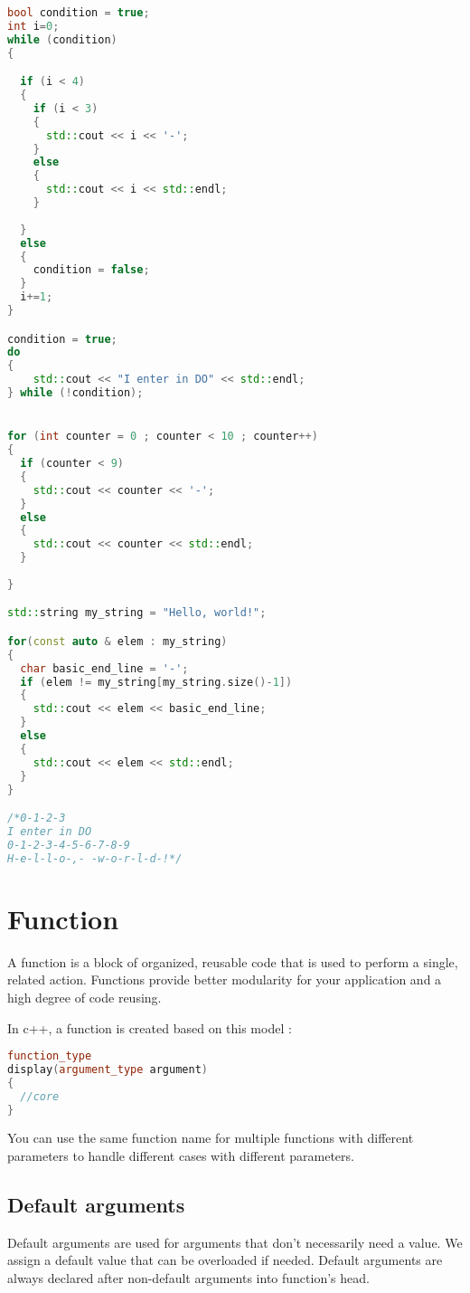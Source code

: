 \documentclass[a4paper, 12pt, titlepage]{scrartcl} %
\begin{document}
\begin{lstlisting}[language=C++]
bool condition = true;
int i=0;
while (condition)
{

  if (i < 4)
  {
    if (i < 3)
    {
      std::cout << i << '-';
    }
    else
    {
      std::cout << i << std::endl;
    }
    
  }
  else
  {
    condition = false;
  }
  i+=1; 
}

condition = true;
do
{
    std::cout << "I enter in DO" << std::endl;
} while (!condition);


for (int counter = 0 ; counter < 10 ; counter++)
{
  if (counter < 9)
  {
    std::cout << counter << '-';
  }
  else
  {
    std::cout << counter << std::endl;
  }
  
}

std::string my_string = "Hello, world!";

for(const auto & elem : my_string)
{
  char basic_end_line = '-';
  if (elem != my_string[my_string.size()-1])
  {
    std::cout << elem << basic_end_line;
  }
  else
  {
    std::cout << elem << std::endl;
  }
}

/*0-1-2-3
I enter in DO
0-1-2-3-4-5-6-7-8-9
H-e-l-l-o-,- -w-o-r-l-d-!*/
\end{lstlisting} \vspace{5mm}

\newpage
\section{Function}
A function is a block of organized, reusable code that is used to perform a single, related action. Functions provide better modularity for your application and a high degree of code reusing.

In c++, a function is created based on this model :

\begin{lstlisting}[language=C++]
function_type
display(argument_type argument)
{
  //core
}
\end{lstlisting} \vspace{5mm}

You can use the same function name for multiple functions with different parameters to handle different cases with different parameters.

\subsection{Default arguments}
Default arguments are used for arguments that don't necessarily need a value. We assign a default value that can be overloaded if needed. Default arguments are always declared after non-default arguments into function's head. 
\end{document}
